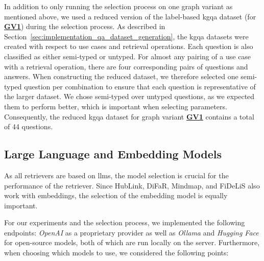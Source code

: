 In addition to only running the selection process on one graph variant as mentioned above, we used a reduced version of the label-based \gls{kgqa} dataset (for \hyperref[enum:gv1]{\textbf{GV1}}) during the selection process. As described in Section~\ref{sec:implementation_qa_dataset_generation}, the \gls{kgqa} datasets were created with respect to use cases and retrieval operations. Each question is also classified as either semi-typed or untyped. For almost any pairing of a use case with a retrieval operation, there are four corresponding pairs of questions and answers. When constructing the reduced dataset, we therefore selected one semi-typed question per combination to ensure that each question is representative of the larger dataset. We chose semi-typed over untyped questions, as we expected them to perform better, which is important when selecting parameters. Consequently, the reduced \gls{kgqa} dataset for graph variant \hyperref[enum:gv1]{\textbf{GV1}} contains a total of 44 questions.





\subsection{Large Language and Embedding Models}
\label{sec:selection_planning_llms}

As all retrievers are based on \glspl{llm}, the model selection is crucial for the performance of the retriever. Since HubLink, DiFaR, Mindmap, and FiDeLiS also work with embeddings, the selection of the embedding model is equally important.

For our experiments and the selection process, we implemented the following endpoints: \emph{OpenAI} as a proprietary provider as well as \emph{Ollama} and \emph{Hugging Face} for open-source models, both of which are run locally on the server. Furthermore, when choosing which models to use, we considered the following points:

